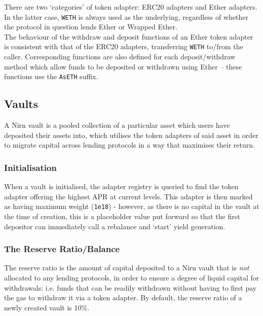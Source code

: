 \documentclass{article}
\begin{document}
\newpage
\noindent
There are two `categories' of token adapter: ERC20 adapters and Ether adapters. In the latter case, \texttt{WETH} is always used as the underlying, regardless of whether the protocol in question lends Ether or Wrapped Ether.\\

\noindent
The behaviour of the withdraw and deposit functions of an Ether token adapter is consistent with that of the ERC20 adapters, transferring \texttt{WETH} to/from the caller. Corresponding functions are also defined for each deposit/withdraw method which allow funds to be deposited or withdrawn using Ether -- these functions use the \texttt{AsETH} suffix.

\subsection{Vaults}

A Nirn vault is a pooled collection of a particular asset which users have deposited their assets into, which utilises the token adapters of said asset in order to migrate capital across lending protocols in a way that maximises their return.

\subsubsection{Initialisation}

\noindent
When a vault is initialised, the adapter registry is queried to find the token adapter offering the highest APR at current levels. This adapter is then marked as having maximum weight (\texttt{1e18}) - however, as there is no capital in the vault at the time of creation, this is a placeholder value put forward so that the first depositor can immediately call a rebalance and `start' yield generation.

\subsubsection{The Reserve Ratio/Balance}

The reserve ratio is the amount of capital deposited to a Nirn vault that is \textit{not} allocated to any lending protocols, in order to ensure a degree of liquid capital for withdrawals: i.e. funds that can be readily withdrawn without having to first pay the gas to withdraw it via a token adapter. By default, the reserve ratio of a newly created vault is 10\%.\\
\end{document}
